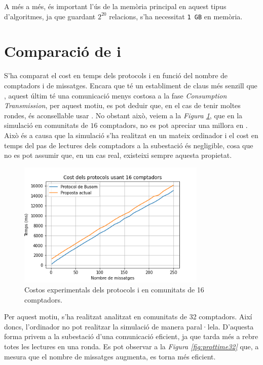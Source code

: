 A més a més, és important l'ús de la memòria principal en aquest tipus d'algoritmes, ja que guardant $2^{20}$ relacions, s'ha necessitat \texttt{1 GB} en memòria.
\section{Comparació de \cite{recsi} i \cite{busom}}
S'ha comparat el cost en temps dels protocols \cite{recsi} i \cite{busom} en funció del nombre de comptadors i de missatges. Encara que \cite{busom} té un establiment de claus més senzill que \cite{recsi}, aquest últim té una comunicació menys costosa a la fase \textit{Consumption Transmission}, per aquest motiu, es pot deduir que, en el cas de tenir moltes rondes, és aconsellable usar \cite{recsi}. No obstant això, veiem a la \textit{Figura \ref{fig:prottime16}}, que en la simulació en comunitats de $16$ comptadors, no es pot apreciar una millora en \cite{recsi}. Això és a causa que la simulació s'ha realitzat en un mateix ordinador i el cost en temps del pas de lectures dels comptadors a la subestació és negligible, cosa que no es pot assumir que, en un cas real, existeixi sempre aquesta propietat.
\begin{figure}[H]
	\centering
	\includegraphics[width=9cm]{imgs/cost/16compt.png}
	\caption{Costos experimentals dels protocols \cite{recsi} i \cite{busom} en comunitats de 16 comptadors.}
	\label{fig:prottime16}
\end{figure}
Per aquest motiu, s'ha realitzat analitzat en comunitats de 32 comptadors. Així doncs, l'ordinador no pot realitzar la simulació de manera paral·lela. D'aquesta forma privem a la subestació d'una comunicació eficient, ja que tarda més a rebre totes les lectures en una ronda. Es pot observar a la \textit{Figura \ref{fig:prottime32}} que, a mesura que el nombre de missatges augmenta, \cite{recsi} es torna més eficient.
